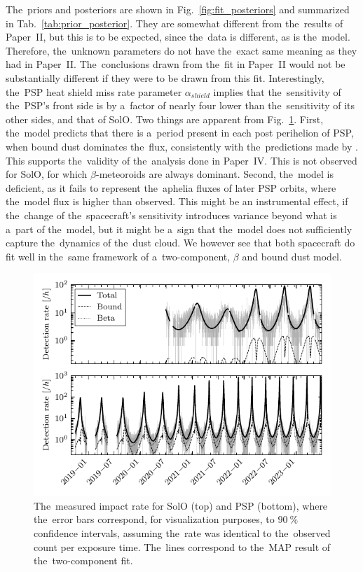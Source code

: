 The~priors and posteriors are shown in Fig.~\ref{fig:fit_posteriors} and summarized in Tab.~\ref{tab:prior_posterior}. They are somewhat different from the~results of Paper~II, but this is to be expected, since the~data is different, as is the~model. Therefore, the~unknown parameters do not have the~exact same meaning as they had in Paper~II. The~conclusions drawn from the~fit in Paper~II would not be substantially different if they were to be drawn from this fit. Interestingly, the~PSP heat shield miss rate parameter $\alpha_{shield}$ implies that the~sensitivity of the~PSP's front side is by a~factor of nearly four lower than the~sensitivity of its other sides, and that of SolO. Two things are apparent from Fig.~\ref{fig:fit_rate}. First, the~model predicts that there is a~period present in each post perihelion of PSP, when bound dust dominates the~flux, consistently with the~predictions made by \citep{szalay2020near,szalay2021collisional}. This supports the~validity of the~analysis done in Paper~IV. This is not observed for SolO, for which $\beta$-meteoroids are always dominant. Second, the~model is deficient, as it fails to represent the~aphelia fluxes of later PSP orbits, where the~model flux is higher than observed. This might be an instrumental effect, if the~change of the~spacecraft's sensitivity introduces variance beyond what is a~part of the~model, but it might be a~sign that the~model does not sufficiently capture the~dynamics of the~dust cloud. We however see that both spacecraft do fit well in the~same framework of a~two-component, $\beta$ and bound dust model. 

\begin{figure}[hb]
 	\centering
 	\includegraphics[width=12cm]{figures/both_shield_rate_log.pdf}
 	\caption{The~measured impact rate for SolO (top) and PSP (bottom), where the~error bars correspond, for visualization purposes, to $\SI{90}{\%}$ confidence intervals, assuming the~rate was identical to the~observed count per exposure time. The~lines correspond to the~MAP result of the~two-component fit.}
 	\label{fig:fit_rate}
\end{figure}







